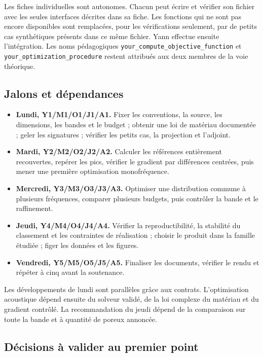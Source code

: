 \documentclass[11pt,a4paper]{article}
\begin{document}
Les fiches individuelles sont autonomes. Chacun peut écrire et vérifier son fichier avec les seules interfaces décrites dans sa fiche. Les fonctions qui ne sont pas encore disponibles sont remplacées, pour les vérifications seulement, par de petits cas synthétiques présents dans ce même fichier. Yann effectue ensuite l'intégration. Les noms pédagogiques {\small\ttfamily \nolinkurl{your_compute_objective_function}} et {\small\ttfamily \nolinkurl{your_optimization_procedure}} restent attribués aux deux membres de la voie théorique.

\subsection{Jalons et dépendances}

\begin{itemize}
\item \textbf{Lundi, Y1/M1/O1/J1/A1.} Fixer les conventions, la source, les dimensions, les bandes et le budget ; obtenir une loi de matériau documentée ; geler les signatures ; vérifier les petits cas, la projection et l'adjoint.
\item \textbf{Mardi, Y2/M2/O2/J2/A2.} Calculer les références entièrement recouvertes, repérer les pics, vérifier le gradient par différences centrées, puis mener une première optimisation monofréquence.
\item \textbf{Mercredi, Y3/M3/O3/J3/A3.} Optimiser une distribution commune à plusieurs fréquences, comparer plusieurs budgets, puis contrôler la bande et le raffinement.
\item \textbf{Jeudi, Y4/M4/O4/J4/A4.} Vérifier la reproductibilité, la stabilité du classement et les contraintes de réalisation ; choisir le produit dans la famille étudiée ; figer les données et les figures.
\item \textbf{Vendredi, Y5/M5/O5/J5/A5.} Finaliser les documents, vérifier le rendu et répéter à cinq avant la soutenance.
\end{itemize}

Les développements de lundi sont parallèles grâce aux contrats. L'optimisation acoustique dépend ensuite du solveur validé, de la loi complexe du matériau et du gradient contrôlé. La recommandation du jeudi dépend de la comparaison sur toute la bande et à quantité de poreux annoncée.

\subsection{Décisions à valider au premier point}
\end{document}
